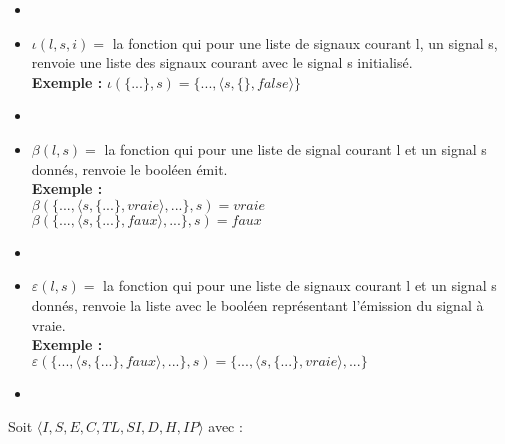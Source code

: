 \documentclass[10pt,a4paper]{article}
\begin{document}
\begin{itemize}
				\item[]
				\item[] $\iota(l,s,i) =$ la fonction qui pour une liste de signaux courant l, un signal s, renvoie une liste des signaux courant avec le signal s initialisé.
				\\\textbf{Exemple :} $\iota(\{...\},s) = \{...,\langle s,\{\},false\rangle\}$
				\item[]
				\item[] $\beta(l,s) =$ la fonction qui pour une liste de signal courant l et un signal s donnés, renvoie le booléen émit.
				\\\textbf{Exemple :}
				\\ $\beta(\{...,\langle s,\{...\},vraie\rangle,...\},s) = vraie$\\
				$\beta(\{...,\langle s,\{...\},faux\rangle,...\},s) = faux$
				\item[] 
				\item[] $\varepsilon(l,s) =$ la fonction qui pour une liste de signaux courant l et un signal s donnés, renvoie la liste avec le booléen représentant l'émission du signal à vraie.
				\\\textbf{Exemple :}
				\\ $\varepsilon(\{...,\langle s,\{...\},faux\rangle,...\},s) = \{...,\langle s,\{...\},vraie\rangle,...\}$
				\item[] 
			\end{itemize}
			\newpage
			Soit $\langle I,S,E,C,TL,SI,D,H,IP\rangle$ avec :
			
\end{document}
